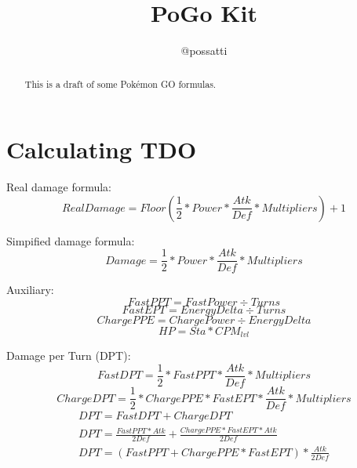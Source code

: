 \documentclass{article}
\begin{document}
\title{PoGo Kit}
\author{@possatti}

\maketitle

\begin{abstract}
This is a draft of some Pokémon GO formulas.
\end{abstract}

\section{Calculating TDO}

Real damage formula:
\begin{equation}
  \label{real_damage_formula}
  RealDamage = Floor(\frac{1}{2} * Power * \frac{Atk}{Def} * Multipliers) + 1
\end{equation}

Simpified damage formula:
\begin{equation}
  \label{simpified_damage_formula}
  Damage = \frac{1}{2} * Power * \frac{Atk}{Def} * Multipliers
\end{equation}

Auxiliary:
\begin{equation}
  \label{PPT}
  FastPPT = FastPower \div Turns
\end{equation}
\begin{equation}
  \label{EPT}
  FastEPT = EnergyDelta \div Turns
\end{equation}
\begin{equation}
  \label{PPE}
  ChargePPE = ChargePower \div EnergyDelta
\end{equation}
\begin{equation}
    HP = Sta * CPM_{lvl}
\end{equation}

Damage per Turn (DPT):
\begin{equation}
  FastDPT = \frac{1}{2} * FastPPT * \frac{Atk}{Def} * Multipliers
\end{equation}
\begin{equation}
  ChargeDPT = \frac{1}{2} * ChargePPE * FastEPT * \frac{Atk}{Def} * Multipliers
\end{equation}
\begin{equation}
  \begin{aligned}
    DPT = FastDPT + ChargeDPT \\
    DPT = \frac{FastPPT * Atk}{2Def} + \frac{ChargePPE * FastEPT * Atk}{2Def} \\
    DPT = (FastPPT + ChargePPE * FastEPT) * \frac{Atk}{2Def} \\
  \end{aligned}
\end{equation}
\end{document}
